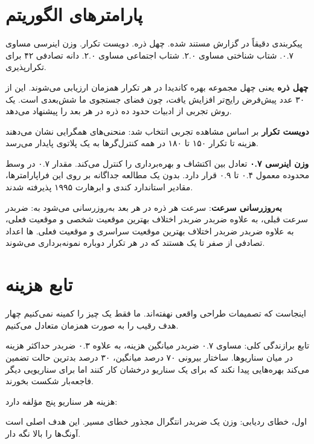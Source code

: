 \documentclass[12pt, a4paper]{article}
\newcommand{\dash}{\lr{---}}
\begin{document}
\section{پارامترهای الگوريتم}

پيکربندی  دقيقاً در گزارش مستند شده. چهل ذره. دويست تکرار. وزن اينرسی  مساوی ۰.۷. شتاب شناختی  مساوی ۲.۰. شتاب اجتماعی  مساوی ۲.۰. دانه تصادفی ۴۲ برای تکرارپذيری.

\textbf{چهل ذره} يعنی چهل مجموعه بهره کانديدا در هر تکرار همزمان ارزيابی می‌شوند. اين از ۳۰ عدد \dash{} پيش‌فرض رايج‌تر \dash{} افزايش يافت، چون فضای جستجوی ما شش‌بعدی است. يک روش تجربی از ادبيات  حدود ده ذره در هر بعد را پيشنهاد می‌دهد.

\textbf{دويست تکرار} بر اساس مشاهده تجربی انتخاب شد: منحنی‌های همگرايی نشان می‌دهند هزينه تا تکرار ۱۵۰ تا ۱۸۰ در همه کنترل‌گرها به يک پلاتوی پايدار می‌رسد.

\textbf{وزن اينرسی ۰.۷} تعادل بين اکتشاف و بهره‌برداری را کنترل می‌کند. مقدار ۰.۷ در وسط محدوده معمول ۰.۴ تا ۰.۹ قرار دارد. بدون يک مطالعه جداگانه بر روی اين فراپارامترها، مقادير استاندارد کندی و ابرهارت ۱۹۹۵ پذيرفته شدند.

\textbf{به‌روزرسانی سرعت}: سرعت هر ذره در هر بعد به‌روزرسانی می‌شود به:  ضربدر سرعت قبلی، به علاوه  ضربدر  ضربدر اختلاف بهترين موقعيت شخصی و موقعيت فعلی، به علاوه  ضربدر  ضربدر اختلاف بهترين موقعيت سراسری و موقعيت فعلی.  ها اعداد تصادفی از صفر تا يک هستند که در هر تکرار دوباره نمونه‌برداری می‌شوند.

\section{تابع هزينه}

اينجاست که تصميمات طراحی واقعی نهفته‌اند. ما فقط يک چيز را کمينه نمی‌کنيم \dash{} چهار هدف رقيب را به صورت همزمان متعادل می‌کنيم.

تابع برازندگی کلی:  مساوی ۰.۷ ضربدر ميانگين هزينه، به علاوه ۰.۳ ضربدر حداکثر هزينه در ميان سناريوها. ساختار بيرونی \dash{} ۷۰ درصد ميانگين، ۳۰ درصد بدترين حالت \dash{} تضمين می‌کند  بهره‌هايی پيدا نکند که برای يک سناريو درخشان کار کنند اما برای سناريويی ديگر فاجعه‌بار شکست بخورند.

هزينه هر سناريو پنج مؤلفه دارد:

اول، خطای رديابی: وزن يک ضربدر انتگرال مجذور خطای مسير. اين هدف اصلی است \dash{} آونگ‌ها را بالا نگه دار.
\end{document}
